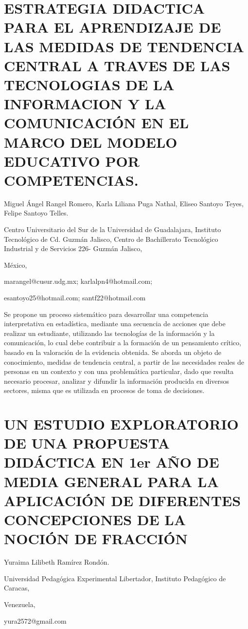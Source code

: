 \section{ESTRATEGIA DIDACTICA PARA EL APRENDIZAJE DE LAS MEDIDAS DE TENDENCIA
CENTRAL A TRAVES DE LAS TECNOLOGIAS DE LA INFORMACION Y LA COMUNICACIÓN
EN EL MARCO DEL MODELO EDUCATIVO POR COMPETENCIAS.}

\begin{datos}

Miguel Ángel Rangel Romero, Karla Liliana Puga Nathal, Eliseo Santoyo
Teyes, Felipe Santoyo Telles.

Centro Universitario del Sur de la Universidad de Guadalajara, Instituto
Tecnológico de Cd. Guzmán Jalisco, Centro de Bachillerato Tecnológico
Industrial y de Servicios 226- Guzmán Jalisco,

México,

marangel@cusur.udg.mx; karlalpn4@hotmail.com; 

esantoyo25@hotmail.com; santf22@hotmail.com

\end{datos}

Se propone un proceso sistemático para desarrollar una competencia
interpretativa en estadística, mediante una secuencia de acciones
que debe realizar un estudiante, utilizando las tecnologías de la
información y la comunicación, lo cual debe contribuir a la formación
de un pensamiento crítico, basado en la valoración de la evidencia
obtenida. Se aborda un objeto de conocimiento, medidas de tendencia
central, a partir de las necesidades reales de personas en un contexto
y con una problemática particular, dado que resulta necesario procesar,
analizar y difundir la información producida en diversos sectores,
misma que es utilizada en procesos de toma de decisiones. 


\section{UN ESTUDIO EXPLORATORIO DE UNA PROPUESTA DIDÁCTICA EN 1er AÑO DE
MEDIA GENERAL PARA LA APLICACIÓN DE DIFERENTES CONCEPCIONES DE LA
NOCIÓN DE FRACCIÓN}

\begin{datos}

Yuraima Lilibeth Ramírez Rondón.

Universidad Pedagógica Experimental Libertador, Instituto Pedagógico
de Caracas,

Venezuela,

yura2572@gmail.com

\end{datos}

